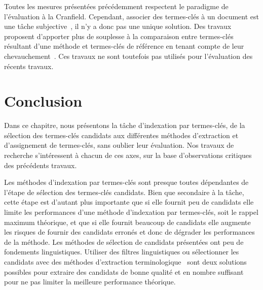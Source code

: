     Toutes les mesures présentées précédemment respectent le paradigme de
    l'évaluation \og{}à la Cranfield\fg{}. Cependant, associer des termes-clés à
    un document est une tâche subjective~\cite{hasan2014state_of_the_art}, il
    n'y a donc pas une unique solution. Des travaux proposent d'apporter plus de
    souplesse à la comparaison entre termes-clés résultant d'une méthode et
    termes-clés de référence en tenant compte de leur
    chevauchement~\cite{zesch2009rprecision,kim2010rprecision}. Ces travaux
    ne sont toutefois pas utilisés pour l'évaluation des récents travaux.

  \section{Conclusion}
  \label{sec:main-state_of_the_art-automatic_evaluation_of_keyphrase_annotation-conclusion}
    Dans ce chapitre, nous présentons la tâche d'indexation par termes-clés, de
    la sélection des termes-clés candidats aux différentes méthodes d'extraction
    et d'assignement de termes-clés, sans oublier leur évaluation. Nos travaux
    de recherche s'intéressent à chacun de ces axes, sur la base d'observations
    critiques des précédents travaux.

    Les méthodes d'indexation par termes-clés sont presque toutes dépendantes
    de l'étape de sélection des termes-clés candidats. Bien que secondaire à la
    tâche, cette étape est d'autant plus importante que si elle fournit peu de
    candidats elle limite les performances d'une méthode d'indexation par
    termes-clés, soit le rappel maximum théorique, et que si elle fournit
    beaucoup de candidats elle augmente les risques de fournir des candidats
    erronés et donc de dégrader les performances de la méthode. Les méthodes de
    sélection de candidats présentées ont peu de fondements linguistiques.
    Utiliser des filtres linguistiques ou sélectionner les candidats avec des
    méthodes d'extraction
    terminologique~\cite{jacquemin1997fastr,daille2003acabit,rocheteau2011termsuite}
    sont deux solutions possibles pour extraire des candidats de bonne qualité
    et en nombre suffisant pour ne pas limiter la meilleure performance
    théorique.

